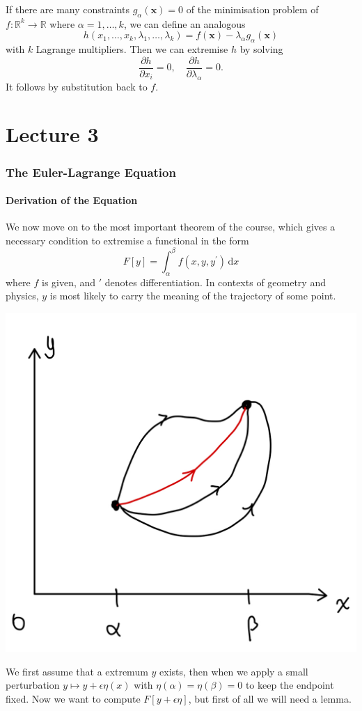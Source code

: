 \documentclass{article}
\begin{document}
If there are many constraints $g_\alpha(\mathbf{x})=0$ of the minimisation problem of $f:\mathbb R^k\to\mathbb R$ where $\alpha=1,\dots,k$, we can define an analogous
$$h(x_1,\ldots,x_k,\lambda_1,\ldots,\lambda_k)=f(\mathbf{x})-\lambda_\alpha g_\alpha(\mathbf{x})$$
with $k$ Lagrange multipliers. Then we can extremise $h$ by solving 
\[
    \frac{\partial h}{\partial x_i} = 0,\quad \frac{\partial h}{\partial \lambda_\alpha}=0.  
\]
It follows by substitution back to $f$.
\newpage
\part*{Lecture 3}
\section{The Euler-Lagrange Equation}
\subsection{Derivation of the Equation}
We now move on to the most important theorem of the course, which gives a necessary condition to extremise a functional in the form
$$F[y]=\int_\alpha^\beta f(x,y,y^\prime)\,\mathrm dx$$
where $f$ is given, and $'$ denotes differentiation.
In contexts of geometry and physics, $y$ is most likely to carry the meaning of the trajectory of some point.
\begin{center}
    \includegraphics[scale=0.12]{euler-lagrange1.jpeg}
\end{center}
We first assume that a extremum $y$ exists, then when we apply a small perturbation $y\mapsto y+\epsilon\eta(x)$ with $\eta(\alpha)=\eta(\beta)=0$ to keep the endpoint fixed.
Now we want to compute $F[y+\epsilon\eta]$, but first of all we will need a lemma.
\end{document}
